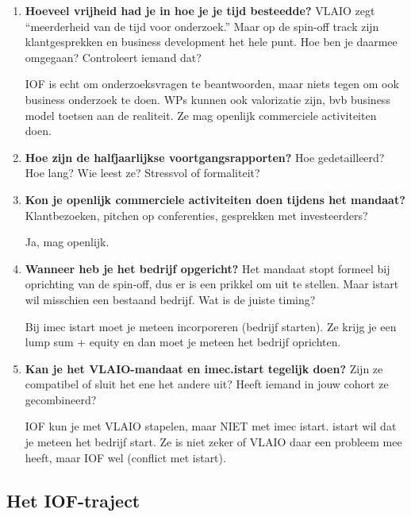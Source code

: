 \documentclass[11pt,a4paper]{article}
\newcommand{\notebox}{%
\begin{tcolorbox}[colback=notebg, colframe=noteborder, boxrule=0.5pt, arc=2pt, left=4pt, right=4pt, top=2pt, bottom=2pt]
\vspace{2.2cm}
\end{tcolorbox}
}
\newcommand{\filledbox}[1]{%
\begin{tcolorbox}[colback=notebg, colframe=noteborder, boxrule=0.5pt, arc=2pt, left=4pt, right=4pt, top=2pt, bottom=2pt]
#1
\end{tcolorbox}
}
\begin{document}
\begin{enumerate}[resume]

\item \textbf{Hoeveel vrijheid had je in hoe je je tijd besteedde?} VLAIO zegt ``meerderheid van de tijd voor onderzoek.'' Maar op de spin-off track zijn klantgesprekken en business development het hele punt. Hoe ben je daarmee omgegaan? Controleert iemand dat?

\filledbox{IOF is echt om onderzoeksvragen te beantwoorden, maar niets tegen om ook business onderzoek te doen. WPs kunnen ook valorizatie zijn, bvb business model toetsen aan de realiteit. Ze mag openlijk commerciele activiteiten doen.}

\item \textbf{Hoe zijn de halfjaarlijkse voortgangsrapporten?} Hoe gedetailleerd? Hoe lang? Wie leest ze? Stressvol of formaliteit?

\notebox

\item \textbf{Kon je openlijk commerciele activiteiten doen tijdens het mandaat?} Klantbezoeken, pitchen op conferenties, gesprekken met investeerders?

\filledbox{Ja, mag openlijk.}

\item \textbf{Wanneer heb je het bedrijf opgericht?} Het mandaat stopt formeel bij oprichting van de spin-off, dus er is een prikkel om uit te stellen. Maar istart wil misschien een bestaand bedrijf. Wat is de juiste timing?

\filledbox{Bij imec istart moet je meteen incorporeren (bedrijf starten). Ze krijg je een lump sum + equity en dan moet je meteen het bedrijf oprichten.}

\item \textbf{Kan je het VLAIO-mandaat en imec.istart tegelijk doen?} Zijn ze compatibel of sluit het ene het andere uit? Heeft iemand in jouw cohort ze gecombineerd?

\filledbox{IOF kun je met VLAIO stapelen, maar NIET met imec istart. istart wil dat je meteen het bedrijf start. Ze is niet zeker of VLAIO daar een probleem mee heeft, maar IOF wel (conflict met istart).}

\end{enumerate}

\subsection{Het IOF-traject}
\end{document}
